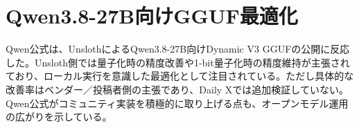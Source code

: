 \section{Qwen3.8-27B向けGGUF最適化}
Qwen公式は、UnslothによるQwen3.8-27B向けDynamic V3 GGUFの公開に反応した。Unsloth側では量子化時の精度改善や1-bit量子化時の精度維持が主張されており、ローカル実行を意識した最適化として注目されている。ただし具体的な改善率はベンダー／投稿者側の主張であり、Daily Xでは追加検証していない。Qwen公式がコミュニティ実装を積極的に取り上げる点も、オープンモデル運用の広がりを示している。
